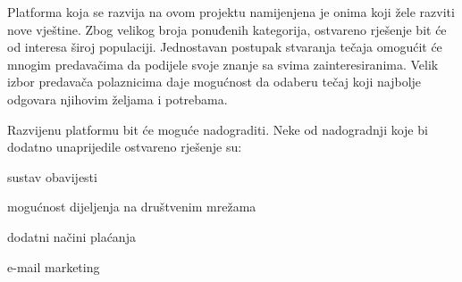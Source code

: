	Platforma koja se razvija na ovom projektu namijenjena je onima koji žele razviti nove vještine. Zbog velikog broja ponuđenih kategorija, ostvareno rješenje bit će od interesa široj populaciji. Jednostavan postupak stvaranja tečaja omogućit će mnogim predavačima da podijele svoje znanje sa svima zainteresiranima. Velik izbor predavača polaznicima daje mogućnost da odaberu tečaj koji najbolje odgovara njihovim željama i potrebama.
	
	Razvijenu platformu bit će moguće nadograditi. Neke od nadogradnji koje bi dodatno unaprijedile ostvareno rješenje su:
	\begin{packed_item}
		\item sustav obavijesti
		\item mogućnost dijeljenja na društvenim mrežama
		\item dodatni načini plaćanja
		\item e-mail marketing
	\end{packed_item}

		\eject
		

	